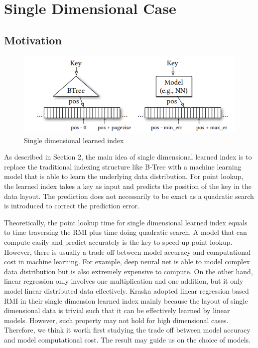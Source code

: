 \documentclass[sigconf,10pt]{acmart}
\begin{document}
\section{Single Dimensional Case}

\subsection{Motivation}

\begin{figure}[h]
  \includegraphics[scale=0.6]{../figures/single-dim-learned-index}
  \caption{Single dimensional learned index \cite{Learned_Index}}
  \label{single-dimensional-learned-index}
\end{figure}

As described in Section 2, the main idea of single dimensional learned index is to replace
the traditional indexing structure like B-Tree with a machine learning model that is able
to learn the underlying data distribution. For point lookup, the learned index takes a key
as input and predicts the position of the key in the data layout. The prediction does not
necessarily to be exact as a quadratic search is introduced to correct the prediction error.

Theoretically, the point lookup time for single dimensional learned index equals to time
traversing the RMI plus time doing quadratic search. A model that can compute easily and predict
accurately is the key to speed up point lookup. However, there is usually a trade off between
model accuracy and computational cost in machine learning. For example, deep neural net is able
to model complex data distribution but is also extremely expensive to compute. On the other hand,
linear regression only involves one multiplication and one addition, but it only model linear
distributed data effectively. Kraska adopted linear regression based RMI in their single dimension
learned index mainly because the layout of single dimensional data is trivial such that it can be
effectively learned by linear models. However, such property may not hold for high dimensional cases.
Therefore, we think it worth first studying the trade off between model accuracy and model
computational cost. The result may guide us on the choice of models. 
\end{document}
